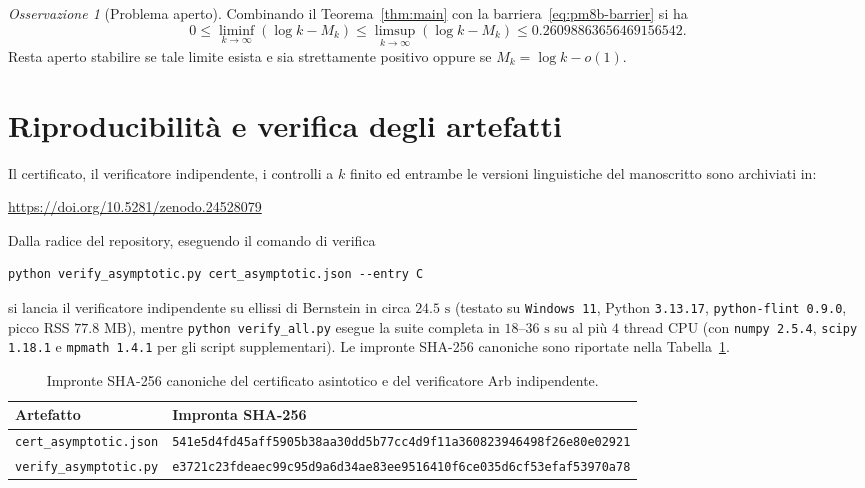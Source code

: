 \documentclass[11pt, reqno]{amsart}
\theoremstyle{remark}
\newtheorem{remark}[lemma]{Osservazione}
\numberwithin{equation}{section}
\begin{document}
\begin{remark}[Problema aperto]
Combinando il Teorema~\ref{thm:main} con la barriera~\eqref{eq:pm8b-barrier} si ha
\[
0 \le \liminf_{k\to\infty}(\log k - M_k) \le \limsup_{k\to\infty}(\log k - M_k) \le 0.26098863656469156542.
\]
Resta aperto stabilire se tale limite esista e sia strettamente positivo oppure se $M_k = \log k - o(1)$.
\end{remark}

\section{Riproducibilità e verifica degli artefatti}\label{sec:repro}

Il certificato, il verificatore indipendente, i controlli a $k$ finito ed entrambe le versioni
linguistiche del manoscritto sono archiviati in:
\begin{center}
\url{https://doi.org/10.5281/zenodo.24528079}
\end{center}
Dalla radice del repository, eseguendo il comando di verifica
\begin{samepage}
\begin{verbatim}
python verify_asymptotic.py cert_asymptotic.json --entry C
\end{verbatim}
\end{samepage}
si lancia il verificatore indipendente su ellissi di Bernstein in circa $24.5\text{ s}$ (testato su
\texttt{Windows~11}, Python \texttt{3.13.17}, \texttt{python-flint 0.9.0}, picco RSS $77.8\text{ MB}$),
mentre \texttt{python verify\_all.py} esegue la suite completa in $18\text{--}36\text{ s}$ su al più
$4$ thread CPU (con \texttt{numpy 2.5.4}, \texttt{scipy 1.18.1} e \texttt{mpmath 1.4.1} per gli
script supplementari). Le impronte SHA-256 canoniche sono riportate nella Tabella~\ref{tab:sha256}.

\begin{table}[ht]
\centering
\caption{Impronte SHA-256 canoniche del certificato asintotico e del verificatore Arb indipendente.}\label{tab:sha256}
\small
\begin{tabular}{@{}ll@{}}
\toprule
Artefatto & Impronta SHA-256 \\
\midrule
\texttt{cert\_asymptotic.json} & \texttt{\scriptsize 541e5d4fd45aff5905b38aa30dd5b77cc4d9f11a360823946498f26e80e02921} \\
\texttt{verify\_asymptotic.py} & \texttt{\scriptsize e3721c23fdeaec99c95d9a6d34ae83ee9516410f6ce035d6cf53efaf53970a78} \\
\bottomrule
\end{tabular}
\end{table}
\end{document}
